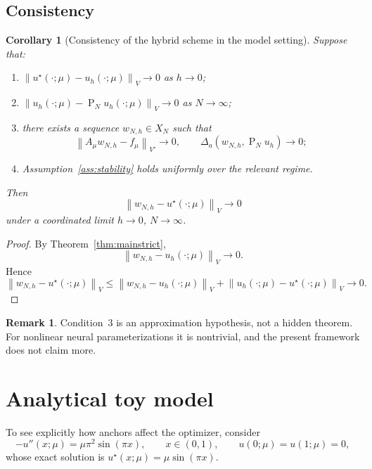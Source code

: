 \documentclass[preprint,12pt]{elsarticle}
\newtheorem{corollary}[theorem]{Corollary}
\theoremstyle{definition}
\newtheorem{remark}[theorem]{Remark}
\numberwithin{equation}{section}
\newcommand{\norm}[1]{\left\lVert #1 \right\rVert}
\newcommand{\Proj}{\operatorname{P}}
\begin{document}
\subsection{Consistency}

\begin{corollary}[Consistency of the hybrid scheme in the model setting]
\label{cor:consistency}
Suppose that:
\begin{enumerate}[label=\arabic*)]
    \item $\norm{u^\star(\cdot;\mu)-u_h(\cdot;\mu)}_V\to 0$ as $h\to 0$;
    \item $\norm{u_h(\cdot;\mu)-\Proj_Nu_h(\cdot;\mu)}_V\to 0$ as $N\to\infty$;
    \item there exists a sequence $w_{N,h}\in X_N$ such that
    \[
    \norm{A_\mu w_{N,h}-f_\mu}_{V'}\to 0,
    \qquad
    \Delta_a(w_{N,h},\Proj_Nu_h)\to 0;
    \]
    \item Assumption~\ref{ass:stability} holds uniformly over the relevant regime.
\end{enumerate}
Then
\[
\norm{w_{N,h}-u^\star(\cdot;\mu)}_V\to 0
\]
under a coordinated limit $h\to 0$, $N\to\infty$.
\end{corollary}

\begin{proof}
By Theorem~\ref{thm:mainstrict},
\[
\norm{w_{N,h}-u_h(\cdot;\mu)}_V\to 0.
\]
Hence
\[
\norm{w_{N,h}-u^\star(\cdot;\mu)}_V
\le
\norm{w_{N,h}-u_h(\cdot;\mu)}_V
+
\norm{u_h(\cdot;\mu)-u^\star(\cdot;\mu)}_V\to 0.
\]
\end{proof}

\begin{remark}
Condition~3 is an approximation hypothesis, not a hidden theorem. For nonlinear neural parameterizations it is nontrivial, and the present framework does not claim more.
\end{remark}

\section{Analytical toy model}
\label{sec:toy}

To see explicitly how anchors affect the optimizer, consider
\begin{equation}
-u''(x;\mu)=\mu \pi^2\sin(\pi x),\qquad x\in(0,1),\qquad u(0;\mu)=u(1;\mu)=0,
\label{eq:modelpde}
\end{equation}
whose exact solution is $u^\star(x;\mu)=\mu\sin(\pi x)$.
\end{document}
